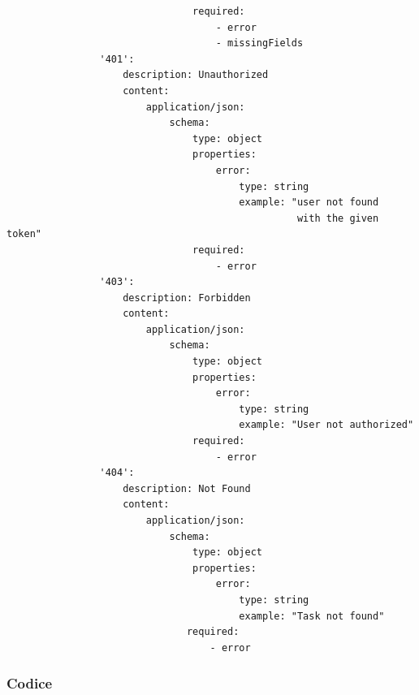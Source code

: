 \documentclass{report}
\begin{document}
\begin{verbatim}
                                required:
                                    - error
                                    - missingFields
                '401':
                    description: Unauthorized
                    content:
                        application/json:
                            schema:
                                type: object
                                properties:
                                    error:
                                        type: string
                                        example: "user not found
                                                  with the given token"
                                required:
                                    - error
                '403':
                    description: Forbidden
                    content:
                        application/json:
                            schema:
                                type: object
                                properties:
                                    error:
                                        type: string
                                        example: "User not authorized"
                                required:
                                    - error
                '404':
                    description: Not Found
                    content:
                        application/json:
                            schema:
                                type: object
                                properties:
                                    error:
                                        type: string
                                        example: "Task not found"
                               required:
                                   - error
\end{verbatim}

\subsubsection*{Codice}
\end{document}
